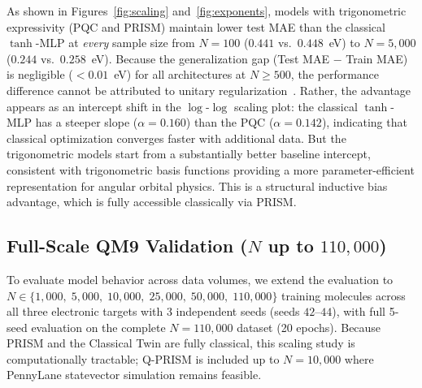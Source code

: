 \documentclass[10pt,twocolumn,letterpaper]{article}
\begin{document}
As shown in Figures~\ref{fig:scaling} and~\ref{fig:exponents}, models with trigonometric expressivity (PQC and PRISM) maintain lower test MAE than the classical $\tanh$-MLP at \textit{every} sample size from $N = 100$ ($0.441$ vs.\ $0.448$~eV) to $N = 5{,}000$ ($0.244$ vs.\ $0.258$~eV). Because the generalization gap (Test MAE $-$ Train MAE) is negligible ($< 0.01$~eV) for all architectures at $N \ge 500$, the performance difference cannot be attributed to unitary regularization~\cite{Caro:2021mgf}. Rather, the advantage appears as an intercept shift in the $\log$-$\log$ scaling plot: the classical $\tanh$-MLP has a steeper slope ($\alpha = 0.160$) than the PQC ($\alpha = 0.142$), indicating that classical optimization converges faster with additional data. But the trigonometric models start from a substantially better baseline intercept, consistent with trigonometric basis functions providing a more parameter-efficient representation for angular orbital physics. This is a structural inductive bias advantage, which is fully accessible classically via PRISM.

\subsection{Full-Scale QM9 Validation \texorpdfstring{($N$ up to $110{,}000$)}{(N up to 110,000)}}
\label{sec:scaling}

To evaluate model behavior across data volumes, we extend the evaluation to $N \in \{1{,}000,\; 5{,}000,\; 10{,}000,\; 25{,}000,\; 50{,}000,\; 110{,}000\}$ training molecules across all three electronic targets with 3 independent seeds (seeds $42$--$44$), with full 5-seed evaluation on the complete $N = 110{,}000$ dataset (20 epochs). Because PRISM and the Classical Twin are fully classical, this scaling study is computationally tractable; Q-PRISM is included up to $N = 10{,}000$ where PennyLane statevector simulation remains feasible.
\end{document}
